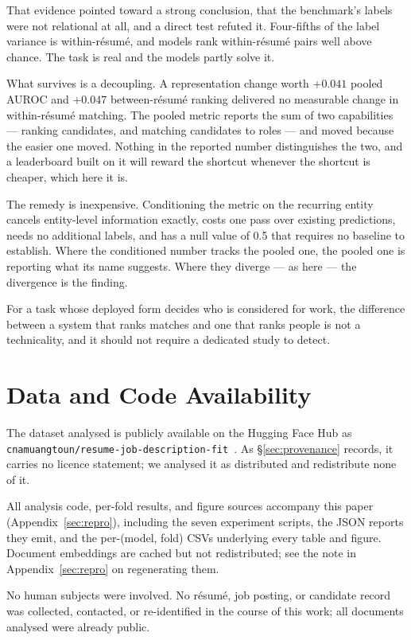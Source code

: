 \documentclass[11pt]{article}                      %
\begin{document}
That evidence pointed toward a strong conclusion, that the benchmark's labels
were not relational at all, and a direct test refuted it. Four-fifths of the label
variance is within-résumé, and models rank within-résumé pairs well above chance.
The task is real and the models partly solve it.

What survives is a decoupling. A representation change worth $+0.041$ pooled
AUROC and $+0.047$ between-résumé ranking delivered no measurable change in
within-résumé matching. The pooled metric reports the sum of two capabilities ---
ranking candidates, and matching candidates to roles --- and moved because the
easier one moved. Nothing in the reported number distinguishes the two, and a
leaderboard built on it will reward the shortcut whenever the shortcut is
cheaper, which here it is.

The remedy is inexpensive. Conditioning the metric on the recurring entity
cancels entity-level information exactly, costs one pass over existing
predictions, needs no additional labels, and has a null value of 0.5 that
requires no baseline to establish. Where the conditioned number tracks the pooled
one, the pooled one is reporting what its name suggests. Where they diverge --- as
here --- the divergence is the finding.

For a task whose deployed form decides who is considered for work, the difference
between a system that ranks matches and one that ranks people is not a
technicality, and it should not require a dedicated study to detect.

\section*{Data and Code Availability}

The dataset analysed is publicly available on the Hugging Face Hub as
\texttt{cnamuangtoun/resume-job-description-fit}~\cite{resumejobfit2024}. As
\S\ref{sec:provenance} records, it carries no licence statement; we analysed it
as distributed and redistribute none of it.

All analysis code, per-fold results, and figure sources accompany this paper
(Appendix~\ref{sec:repro}), including the seven experiment scripts, the JSON
reports they emit, and the per-(model, fold) CSVs underlying every table and
figure. Document embeddings are cached but not redistributed; see the note in
Appendix~\ref{sec:repro} on regenerating them.

No human subjects were involved. No résumé, job posting, or candidate record was
collected, contacted, or re-identified in the course of this work; all documents
analysed were already public.
\end{document}
